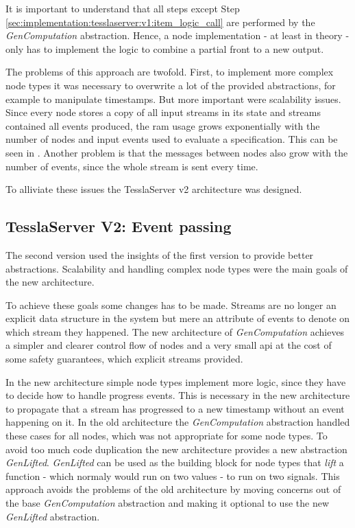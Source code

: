 It is important to understand that all steps except Step \ref{sec:implementation:tesslaserver:v1:item_logic_call} are performed by the \emph{GenComputation} abstraction.
Hence, a node implementation - at least in theory - only has to implement the logic to combine a partial front to a new output.

The problems of this approach are twofold.
First, to implement more complex node types it was necessary to overwrite a lot of the provided abstractions, for example to manipulate timestamps.
But more important were scalability issues.
Since every node stores a copy of all input streams in its state and streams contained all events produced, the \gls{ram} usage grows exponentially with the number of nodes and input events used to evaluate a specification.
This can be seen in .
Another problem is that the messages between nodes also grow with the number of events, since the whole stream is sent every time.

To alliviate these issues the TesslaServer v2 architecture was designed.

\subsection{TesslaServer V2: Event passing}
\label{sec:implementation:tesslaserver:v2}

The second version used the insights of the first version to provide better abstractions.
Scalability and handling complex node types were the main goals of the new architecture.

To achieve these goals some changes has to be made.
Streams are no longer an explicit data structure in the system but mere an attribute of events to denote on which stream they happened.
The new architecture of \emph{GenComputation} achieves a simpler and clearer control flow of nodes and a very small \gls{api} at the cost of some safety guarantees, which explicit streams provided.

In the new architecture simple node types implement more logic, since they have to decide how to handle progress events.
This is necessary in the new architecture to propagate that a stream has progressed to a new timestamp without an event happening on it.
In the old architecture the \emph{GenComputation} abstraction handled these cases for all nodes, which was not appropriate for some node types.
To avoid too much code duplication the new architecture provides a new abstraction \emph{GenLifted}.
\emph{GenLifted} can be used as the building block for node types that \emph{lift} a function - which normaly would run on two values - to run on two signals.
This approach avoids the problems of the old architecture by moving concerns out of the base \emph{GenComputation} abstraction and making it optional to use the new \emph{GenLifted} abstraction.


